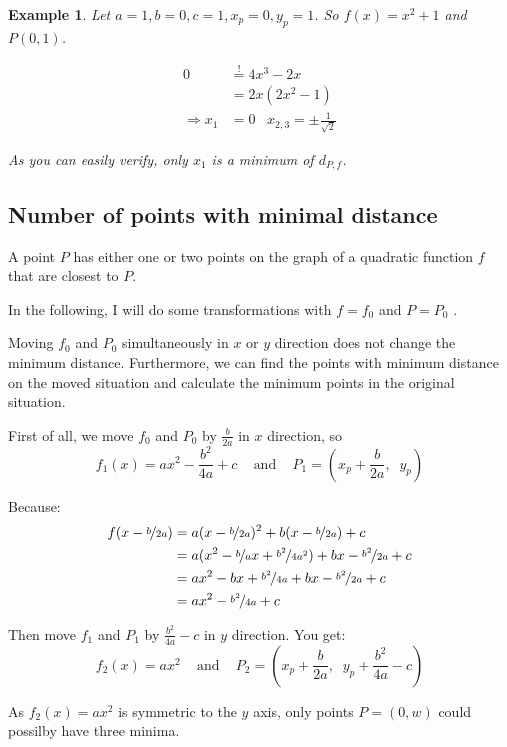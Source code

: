 \documentclass[a4paper]{scrartcl}
\theoremstyle{break}
\newtheorem{example}{Example}
\theoremstyle{nonumberplain}
\begin{document}
\begin{example}
    Let $a = 1,  b = 0,  c= 1, x_p= 0, y_p = 1$.
    So $f(x) = x^2 + 1$ and $P(0, 1)$.

\begin{align}
    0 &\stackrel{!}{=} 4 x^3 - 2x\\
      &=2x(2x^2 - 1)\\
    \Rightarrow x_1 &= 0 \;\;\; x_{2,3} = \pm \frac{1}{\sqrt{2}}
\end{align}

As you can easily verify, only $x_1$ is a minimum of $d_{P,f}$.
\end{example}


\subsection{Number of points with minimal distance}
\begin{theorem}
    A point $P$ has either one or two points on the graph of a 
    quadratic function $f$ that are closest to $P$.
\end{theorem}

In the following, I will do some transformations with $f = f_0$ and
$P = P_0$ .

Moving $f_0$ and $P_0$ simultaneously in $x$ or $y$ direction does 
not change the minimum distance. Furthermore, we can find the 
points with minimum distance on the moved situation and calculate
the minimum points in the original situation.

First of all, we move $f_0$ and $P_0$ by $\frac{b}{2a}$ in $x$ direction, so
\[f_1(x) = ax^2 - \frac{b^2}{4a} + c \;\;\;\text{ and }\;\;\; P_1 = \left (x_p+\frac{b}{2a},\;\; y_p \right )\]

Because:
\begin{align}
    f(x-\nicefrac{b}{2a}) &= a (x-\nicefrac{b}{2a})^2 + b (x-\nicefrac{b}{2a}) + c\\
    &= a (x^2 - \nicefrac{b}{a} x + \nicefrac{b^2}{4a^2}) + bx - \nicefrac{b^2}{2a} + c\\
    &= ax^2 - bx + \nicefrac{b^2}{4a} + bx - \nicefrac{b^2}{2a} + c\\
    &= ax^2 -\nicefrac{b^2}{4a} + c
\end{align}


Then move $f_1$ and $P_1$ by $\frac{b^2}{4a}-c$ in $y$ direction. You get:
\[f_2(x) = ax^2\;\;\;\text{ and }\;\;\; P_2 = \left (x_p+\frac{b}{2a},\;\; y_p+\frac{b^2}{4a}-c \right )\]

As $f_2(x) = ax^2$ is symmetric to the $y$ axis, only points 
$P = (0, w)$ could possilby have three minima.
\end{document}
